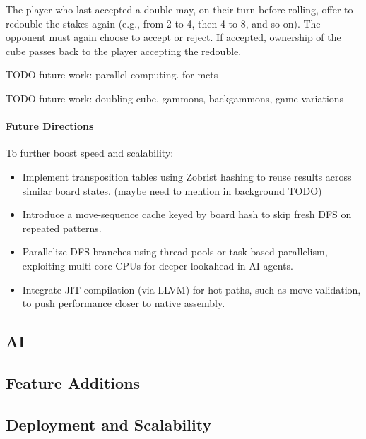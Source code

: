 The player who last accepted a double may, on their turn before rolling, offer to redouble the stakes again (e.g., from 2 to 4, then 4 to 8, and so on). The opponent must again choose to accept or reject. If accepted, ownership of the cube passes back to the player accepting the redouble.

TODO future work: parallel computing. for mcts

TODO future work: doubling cube, gammons, backgammons, game variations

\paragraph{Future Directions}
To further boost speed and scalability:
\begin{itemize}
\item Implement transposition tables using Zobrist hashing to reuse results across similar board states. (maybe need to mention in background TODO)
\item Introduce a move-sequence cache keyed by board hash to skip fresh DFS on repeated patterns.
\item Parallelize DFS branches using thread pools or task-based parallelism, exploiting multi-core CPUs for deeper lookahead in AI agents.
\item Integrate JIT compilation (via LLVM) for hot paths, such as move validation, to push performance closer to native assembly.
\end{itemize}

\subsection{AI}
\subsection{Feature Additions}
\subsection{Deployment and Scalability}



